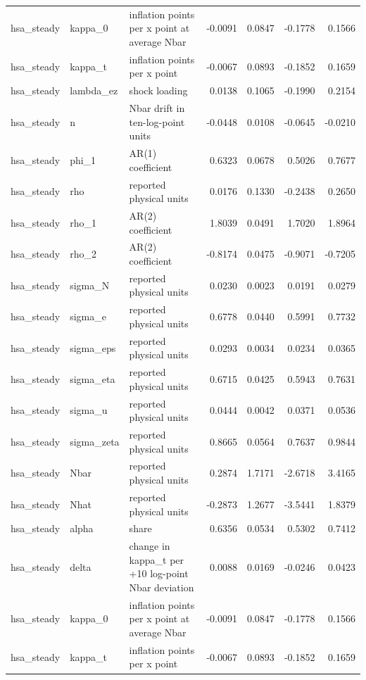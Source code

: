 \begin{tabular}{lllrrrr}
hsa\_steady & kappa\_0 & inflation points per x point at average Nbar & -0.0091 & 0.0847 & -0.1778 & 0.1566 \\
hsa\_steady & kappa\_t & inflation points per x point & -0.0067 & 0.0893 & -0.1852 & 0.1659 \\
hsa\_steady & lambda\_ez & shock loading & 0.0138 & 0.1065 & -0.1990 & 0.2154 \\
hsa\_steady & n & Nbar drift in ten-log-point units & -0.0448 & 0.0108 & -0.0645 & -0.0210 \\
hsa\_steady & phi\_1 & AR(1) coefficient & 0.6323 & 0.0678 & 0.5026 & 0.7677 \\
hsa\_steady & rho & reported physical units & 0.0176 & 0.1330 & -0.2438 & 0.2650 \\
hsa\_steady & rho\_1 & AR(2) coefficient & 1.8039 & 0.0491 & 1.7020 & 1.8964 \\
hsa\_steady & rho\_2 & AR(2) coefficient & -0.8174 & 0.0475 & -0.9071 & -0.7205 \\
hsa\_steady & sigma\_N & reported physical units & 0.0230 & 0.0023 & 0.0191 & 0.0279 \\
hsa\_steady & sigma\_e & reported physical units & 0.6778 & 0.0440 & 0.5991 & 0.7732 \\
hsa\_steady & sigma\_eps & reported physical units & 0.0293 & 0.0034 & 0.0234 & 0.0365 \\
hsa\_steady & sigma\_eta & reported physical units & 0.6715 & 0.0425 & 0.5943 & 0.7631 \\
hsa\_steady & sigma\_u & reported physical units & 0.0444 & 0.0042 & 0.0371 & 0.0536 \\
hsa\_steady & sigma\_zeta & reported physical units & 0.8665 & 0.0564 & 0.7637 & 0.9844 \\
hsa\_steady & Nbar & reported physical units & 0.2874 & 1.7171 & -2.6718 & 3.4165 \\
hsa\_steady & Nhat & reported physical units & -0.2873 & 1.2677 & -3.5441 & 1.8379 \\
hsa\_steady & alpha & share & 0.6356 & 0.0534 & 0.5302 & 0.7412 \\
hsa\_steady & delta & change in kappa\_t per +10 log-point Nbar deviation & 0.0088 & 0.0169 & -0.0246 & 0.0423 \\
hsa\_steady & kappa\_0 & inflation points per x point at average Nbar & -0.0091 & 0.0847 & -0.1778 & 0.1566 \\
hsa\_steady & kappa\_t & inflation points per x point & -0.0067 & 0.0893 & -0.1852 & 0.1659 \\

\end{tabular}
